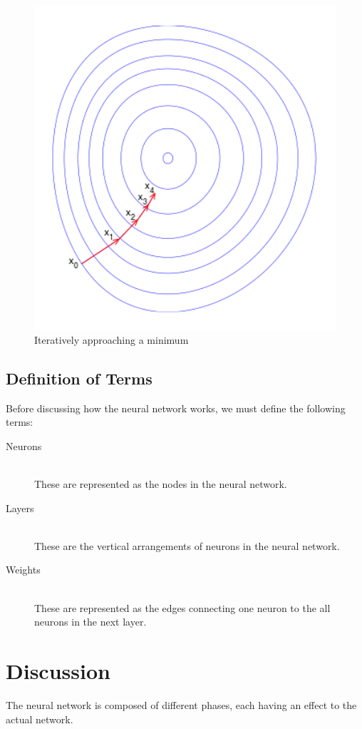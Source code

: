 \documentclass[a4paper, 11pt, english]{article}
\begin{document}
\begin{figure}[H]
  \centering
  \includegraphics[width=12cm]{images/gd4.png}
  \caption{Iteratively approaching a minimum\cite{3blue1brown_2017_2}}
  \label{fig:gd4}
\end{figure}


\subsection{Definition of Terms}
\par Before discussing how the neural network works, we must define the following terms:
\begin{description}
    \item[Neurons] \hfill \\ These are represented as the nodes in the neural network.
    \item[Layers] \hfill \\ These are the vertical arrangements of neurons in the neural network.
    \item[Weights] \hfill \\ These are represented as the edges  connecting one neuron to the all neurons in the next layer.
\end{description}

\section{Discussion}
\par The neural network is composed of different phases, each having an effect to the actual network. %
\end{document}
